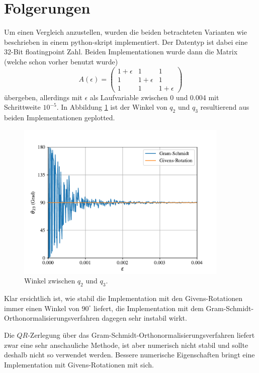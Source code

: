 %
%
%
\section{Folgerungen
\label{qr:section:folgerungen}}
Um einen Vergleich anzustellen, wurden die beiden betrachteten Varianten wie beschrieben in einem python-skript implementiert. 
Der Datentyp ist dabei eine 32-Bit floatingpoint Zahl.
Beiden Implementationen wurde dann die Matrix (welche schon vorher benutzt wurde)
\begin{equation*}
	A(\epsilon)=
	\begin{pmatrix}
	1+\epsilon&1&1\\
	1&1+\epsilon&1\\
	1&1&1+\epsilon
	\end{pmatrix}
\end{equation*}
übergeben, allerdings mit $\epsilon$ als Laufvariable zwischen 0 und 0.004 mit Schrittweite $10^{-5}$.
In Abbildung \ref{qr:comp} ist der Winkel von $q_2$ und $q_3$ resultierend aus beiden Implementationen geplotted.
\begin{figure}[ht]
	\centering
	\includegraphics[width=0.9\textwidth]{papers/qr/pics/comp.pdf}
	\caption{Winkel zwischen $q_2$ und $q_3$.\label{qr:comp}}
\end{figure}
Klar ersichtlich ist, wie stabil die Implementation mit den Givens-Rotationen immer einen Winkel von $90^\circ$ liefert, die Implementation mit dem Gram-Schmidt-Orthonormalisierungsverfahren dagegen sehr instabil wirkt.

Die $QR$-Zerlegung über das Gram-Schmidt-Orthonormalisierungsverfahren liefert zwar eine sehr anschauliche Methode, ist aber numerisch nicht stabil und sollte deshalb nicht so verwendet werden.
Bessere numerische Eigenschaften bringt eine Implementation mit Givens-Rotationen mit sich.